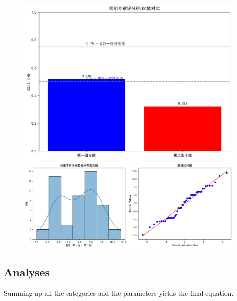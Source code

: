 \begin{figure}[H]
    \centering
    \begin{minipage}[t]{0.5\textwidth}
        \centering
        \includegraphics[width=1\textwidth]{icc_analysis.png}
    \end{minipage}
    \hfill
    \begin{minipage}[t]{1\textwidth}
        \centering
        \includegraphics[width=1\textwidth]{normality_test.png}
    \end{minipage}
\end{figure}

\subsection{Analyses}

Summing up all the categories and the parameters yields the final equation.

